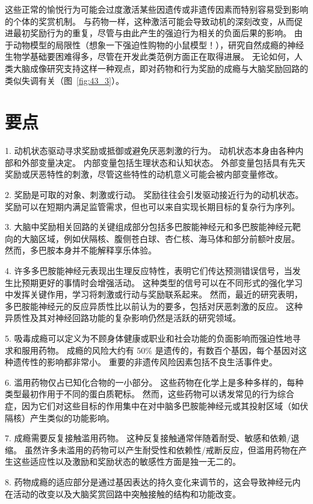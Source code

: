 这些正常的愉悦行为可能会过度激活某些因遗传或非遗传因素而特别容易受到影响的个体的奖赏机制。
与药物一样，这种激活可能会导致动机的深刻改变，从而促进最初奖励行为的重复，尽管与由此产生的强迫行为相关的负面后果的影响。
由于动物模型的局限性（想象一下强迫性购物的小鼠模型！），研究自然成瘾的神经生物学基础要困难得多，尽管在开发此类范例方面正在取得进展。
无论如何，人类大脑成像研究支持这样一种观点，即对药物和行为奖励的成瘾与大脑奖励回路的类似失调有关（图~\ref{fig:43_3}）。



\section{要点}

1. 动机状态驱动寻求奖励或抵御或避免厌恶刺激的行为。
动机状态本身由各种内部和外部变量决定。
内部变量包括生理状态和认知状态。
外部变量包括具有先天奖励或厌恶特性的刺激，尽管这些特性的动机意义可能会被内部变量修改。


2. 奖励是可取的对象、刺激或行动。
奖励往往会引发驱动接近行为的动机状态。
奖励可以在短期内满足监管需求，但也可以来自实现长期目标的复杂行为序列。


3. 大脑中奖励相关回路的关键组成部分包括多巴胺能神经元和多巴胺能神经元靶向的大脑区域，例如伏隔核、腹侧苍白球、杏仁核、海马体和部分前额叶皮层。
然而，多巴胺本身并不能解释享乐体验。 


4. 许多多巴胺能神经元表现出生理反应特性，表明它们传达预测错误信号，当发生比预期更好的事情时会增强活动。
这种类型的信号可以在不同形式的强化学习中发挥关键作用，学习将刺激或行动与奖励联系起来。
然而，最近的研究表明，多巴胺能神经元的反应异质性比以前认为的要多，包括对厌恶刺激的反应。
这种异质性及其对神经回路功能的复杂影响仍然是活跃的研究领域。


5. 吸毒成瘾可以定义为不顾身体健康或职业和社会功能的负面影响而强迫性地寻求和服用药物。
成瘾的风险大约有 50\% 是遗传的，有数百个基因，每个基因对这种遗传性的影响都非常小。
重要的非遗传风险因素包括不良生活事件史。


6. 滥用药物仅占已知化合物的一小部分。
这些药物在化学上是多种多样的，每种类型最初作用于不同的蛋白质靶标。
然而，这些药物可以诱发常见的行为综合症，因为它们对这些目标的作用集中在对中脑多巴胺能神经元或其投射区域（如伏隔核）产生类似的功能影响。


7. 成瘾需要反复接触滥用药物。
这种反复接触通常伴随着耐受、敏感和依赖/退缩。
虽然许多未滥用的药物可以产生耐受性和依赖性/戒断反应，但滥用药物在产生这些适应性以及激励和奖励状态的敏感性方面是独一无二的。


8. 药物成瘾的适应部分是通过基因表达的持久变化来调节的，这会导致神经元内在活动的改变以及大脑奖赏回路中突触接触的结构和功能改变。


